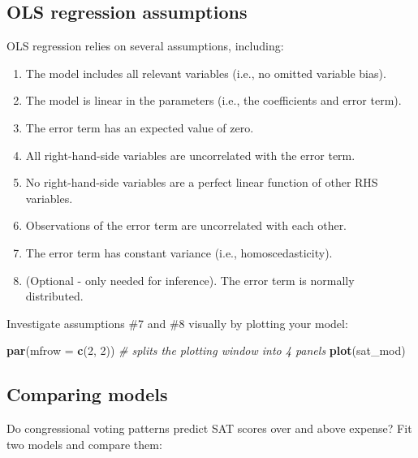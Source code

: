\documentclass[
]{book}
\newenvironment{Shaded}{\begin{snugshade}}{\end{snugshade}}
\newcommand{\CommentTok}[1]{\textcolor[rgb]{0.56,0.35,0.01}{\textit{#1}}}
\newcommand{\DataTypeTok}[1]{\textcolor[rgb]{0.13,0.29,0.53}{#1}}
\newcommand{\DecValTok}[1]{\textcolor[rgb]{0.00,0.00,0.81}{#1}}
\newcommand{\KeywordTok}[1]{\textcolor[rgb]{0.13,0.29,0.53}{\textbf{#1}}}
\newcommand{\NormalTok}[1]{#1}
\providecommand{\tightlist}{%
  \setlength{\itemsep}{0pt}\setlength{\parskip}{0pt}}
\begin{document}
\hypertarget{ols-regression-assumptions}{%
\subsection{OLS regression assumptions}\label{ols-regression-assumptions}}

OLS regression relies on several assumptions, including:

\begin{enumerate}
\def\labelenumi{\arabic{enumi}.}
\tightlist
\item
  The model includes all relevant variables (i.e., no omitted variable bias).
\item
  The model is linear in the parameters (i.e., the coefficients and error term).
\item
  The error term has an expected value of zero.
\item
  All right-hand-side variables are uncorrelated with the error term.
\item
  No right-hand-side variables are a perfect linear function of other RHS variables.
\item
  Observations of the error term are uncorrelated with each other.
\item
  The error term has constant variance (i.e., homoscedasticity).
\item
  (Optional - only needed for inference). The error term is normally distributed.
\end{enumerate}

Investigate assumptions \#7 and \#8 visually by plotting your model:

\begin{Shaded}
\begin{Highlighting}[]
  \KeywordTok{par}\NormalTok{(}\DataTypeTok{mfrow =} \KeywordTok{c}\NormalTok{(}\DecValTok{2}\NormalTok{, }\DecValTok{2}\NormalTok{)) }\CommentTok{# splits the plotting window into 4 panels}
  \KeywordTok{plot}\NormalTok{(sat_mod)}
\end{Highlighting}
\end{Shaded}

\hypertarget{comparing-models}{%
\subsection{Comparing models}\label{comparing-models}}

Do congressional voting patterns predict SAT scores over and above expense? Fit two models and compare them:
\end{document}
